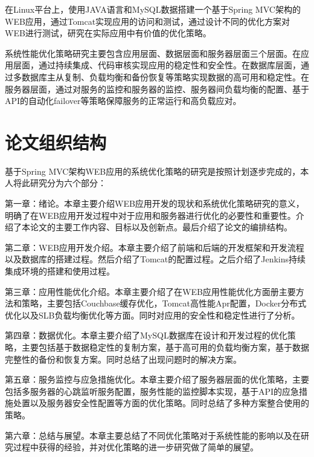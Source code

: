 在Linux平台上，使用JAVA语言和MySQL数据搭建一个基于Spring MVC架构的WEB应用，通过Tomcat实现应用的访问和测试，通过设计不同的优化方案对WEB进行测试，研究在实际应用中有价值的优化策略。

系统性能优化策略研究主要包含应用层面、数据层面和服务器层面三个层面。在应用层面，通过持续集成、代码审核实现应用的稳定性和安全性。在数据库层面，通过多数据库主从复制、负载均衡和备份恢复等策略实现数据的高可用和稳定性。在服务器层面，通过对服务的监控和服务器的监控、服务器间负载均衡的配置、基于API的自动化failover等策略保障服务的正常运行和高负载应对。
\section{论文组织结构}
基于Spring MVC架构WEB应用的系统优化策略的研究是按照计划逐步完成的，本人将此研究分为六个部分：

第一章：绪论。本章主要介绍WEB应用开发的现状和系统优化策略研究的意义，明确了在WEB应用开发过程中对于应用和服务器进行优化的必要性和重要性。介绍了本论文的主要工作内容、目标以及创新点。最后介绍了论文的编排结构。

第二章：WEB应用开发介绍。本章主要介绍了前端和后端的开发框架和开发流程以及数据库的搭建过程。然后介绍了Tomcat的配置过程。之后介绍了Jenkins持续集成环境的搭建和使用过程。

第三章：应用性能优化介绍。本章主要介绍了在WEB应用性能优化方面册主要方法和策略，主要包括Couchbase缓存优化，Tomcat高性能Apr配置，Docker分布式优化以及SLB负载均衡优化等方面。同时对应用的安全性和稳定性进行了分析。

第四章：数据优化。本章主要介绍了MySQL数据库在设计和开发过程的优化策略，主要包括基于数据稳定性的复制方案，基于高可用的负载均衡方案，基于数据完整性的备份和恢复方案。同时总结了出现问题时的解决方案。

第五章：服务监控与应急措施优化。本章主要介绍了服务器层面的优化策略，主要包括多服务器的心跳监听服务配置，服务性能的监控脚本实现，基于API的应急措施处置以及服务器安全性配置等方面的优化策略。同时总结了多种方案整合使用的策略。

第六章：总结与展望。本章主要总结了不同优化策略对于系统性能的影响以及在研究过程中获得的经验，并对优化策略的进一步研究做了简单的展望。